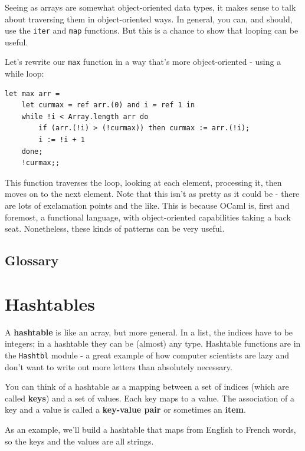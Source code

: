 \documentclass[10pt]{book}
\begin{document}
{Seeing as arrays are somewhat object-oriented data types, it makes sense to 
talk about traversing them in object-oriented ways. In general, you 
can, and should, use the {\tt iter} and {\tt map} functions. But this 
is a chance to show that looping can be useful.

Let's rewrite our {\tt max} function in a way that's more object-oriented - 
using a while loop:

\beforeverb
\begin{verbatim}
let max arr = 
	let curmax = ref arr.(0) and i = ref 1 in
	while !i < Array.length arr do
		if (arr.(!i) > (!curmax)) then curmax := arr.(!i);
		i := !i + 1
	done;
	!curmax;;
\end{verbatim}
\afterverb

This function traverses the loop, looking at each element, processing it,
then moves on to the next element. Note that this isn't as pretty as it 
could be - there are lots of exclamation points and the like. This is because 
OCaml is, first and foremost, a functional language, with object-oriented 
capabilities taking a back seat. Nonetheless, these kinds of patterns can be 
very useful.

\section{Glossary}

\chapter{Hashtables}


A {\bf hashtable} is like an array, but more general.  In a list,
the indices have to be integers; in a hashtable they can
be (almost) any type. Hashtable functions are in the {\tt Hashtbl} 
module - a great example of how computer scientists are lazy and don't 
want to write out more letters than absolutely necessary.

You can think of a hashtable as a mapping between a set of indices
(which are called {\bf keys}) and a set of values.  Each key maps to a
value.  The association of a key and a value is called a {\bf
  key-value pair} or sometimes an {\bf item}.

As an example, we'll build a hashtable that maps from English
to French words, so the keys and the values are all strings.

}
\end{document}
